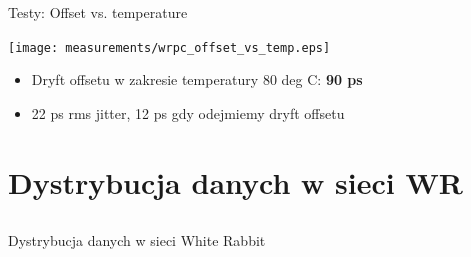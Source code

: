 \documentclass[compress,red]{beamer}
\begin{document}
\begin{frame}{Testy: Offset vs. temperature}

  \begin{center}
    \texttt{[image: measurements/wrpc\_offset\_vs\_temp.eps]}
  \end{center}
  \begin{itemize}
    \item Dryft offsetu w zakresie temperatury 80 deg C: \textbf{90 ps}
    \item 22 ps rms jitter, 12 ps gdy odejmiemy dryft offsetu
  \end{itemize}

\end{frame}




\section{Dystrybucja danych w sieci WR}
\subsection{}
\begin{frame}{Dystrybucja danych w sieci White Rabbit}

  \begin{center}
     \color{red}{Deterministyczny i niezawodny transfer danych}
  \end{center}

\end{frame}
\end{document}
